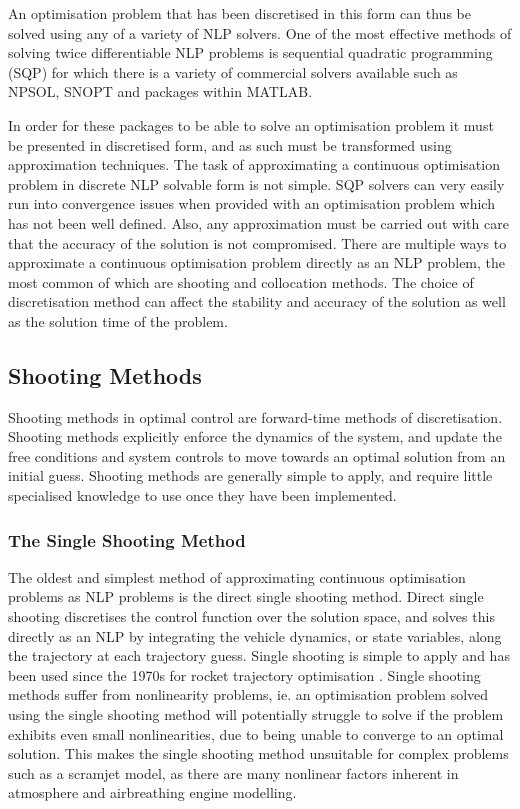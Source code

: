 An optimisation problem that has been discretised in this form can thus be solved using any of a variety of NLP solvers. One of the most effective methods of solving twice differentiable NLP problems is sequential quadratic programming (SQP) \cite{Boggs2000} for which there is a variety of commercial solvers available such as NPSOL, SNOPT and packages within MATLAB. 

In order for these packages to be able to solve an optimisation problem it must be presented in discretised form, and as such must be transformed using approximation techniques. The task of approximating a continuous optimisation problem in discrete NLP solvable form is not simple. SQP solvers can very easily run into convergence issues when provided with an optimisation problem which has not been well defined. Also, any approximation must be carried out with care that the accuracy of the solution is not compromised. 
There are multiple ways to approximate a continuous optimisation problem directly as an NLP problem, the most common of which are shooting and collocation methods. The choice of discretisation method can affect the stability and accuracy of the solution as well as the solution time of the problem. 

\subsection{Shooting Methods}

Shooting methods in optimal control are forward-time methods of discretisation. Shooting methods explicitly enforce the dynamics of the system, and update the free conditions and system controls to move towards an optimal solution from an initial guess. Shooting methods are generally simple to apply, and require little specialised knowledge to use once they have been implemented. 


\subsubsection{The Single Shooting Method}

The oldest and simplest method of approximating continuous optimisation problems as NLP problems is the direct single shooting method. Direct single shooting discretises the control function over the solution space, and solves this directly as an NLP by integrating the vehicle dynamics, or state variables, along the trajectory at each trajectory guess\cite{Betts1998,Kelly2015,Rao2009,Fasano2013}. Single shooting is simple to apply and has been used since the 1970s for rocket trajectory optimisation \cite{jezewski1971}. Single shooting methods suffer from nonlinearity problems, ie. an optimisation problem solved using the single shooting method will potentially struggle to solve if the problem exhibits even small nonlinearities, due to being unable to converge to an optimal solution. This makes the single shooting method unsuitable for complex problems such as a scramjet model, as there are many nonlinear factors inherent in atmosphere and airbreathing engine modelling.

